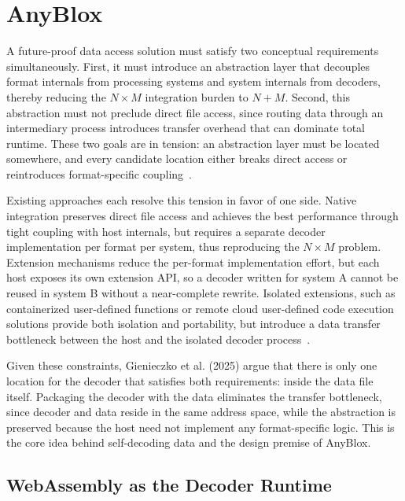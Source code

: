 \section{AnyBlox}

A future-proof data access solution must satisfy two conceptual requirements simultaneously. First, it must introduce an abstraction layer that decouples format internals from processing systems and system internals from decoders, thereby reducing the $N \times M$ integration burden to $N + M$. Second, this abstraction must not preclude direct file access, since routing data through an intermediary process introduces transfer overhead that can dominate total runtime. These two goals are in tension: an abstraction layer must be located somewhere, and every candidate location either breaks direct access or reintroduces format-specific coupling~\cite{gienieczkoAnyBloxFrameworkSelfDecoding2025}.

Existing approaches each resolve this tension in favor of one side. Native integration preserves direct file access and achieves the best performance through tight coupling with host internals, but requires a separate decoder implementation per format per system, thus reproducing the $N \times M$ problem. Extension mechanisms reduce the per-format implementation effort, but each host exposes its own extension API, so a decoder written for system A cannot be reused in system B without a near-complete rewrite. Isolated extensions, such as containerized user-defined functions \cite{saurContainerizedExecutionUDFs2022a} or remote cloud user-defined code execution solutions provide both isolation and portability, but introduce a data transfer bottleneck between the host and the isolated decoder process~\cite{gienieczkoAnyBloxFrameworkSelfDecoding2025}.

Given these constraints, Gienieczko et al. (2025) argue that there is only one location for the decoder that satisfies both requirements: inside the data file itself. Packaging the decoder with the data eliminates the transfer bottleneck, since decoder and data reside in the same address space, while the abstraction is preserved because the host need not implement any format-specific logic. This is the core idea behind self-decoding data and the design premise of AnyBlox.

\subsection{WebAssembly as the Decoder Runtime}

